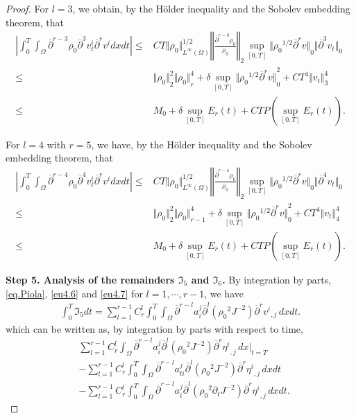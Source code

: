\documentclass[12pt,twoside,reqno]{amsart}
\numberwithin{equation}{section}
\theoremstyle{definition}
\theoremstyle{remark}
\begin{document}
\begin{proof}
For $l=3$, we obtain, by the H\"older inequality and the Sobolev embedding theorem, that
\begin{align*}
  {\left\vert{{\int_0^T\!\!\!\!\int_\Omega }  {\overline{\partial}}^{r-3}{\rho_0} {\overline{\partial}}^3  v_t^i {\overline{\partial}}^r v^idxdt}\right\vert}
  {\leqslant} &CT{\Vert{\rho_0}\Vert}_{L^\infty(\Omega)}^{1/2} {\left\Vert{\frac{{\overline{\partial}}^{r-3}{\rho_0} }{\rho_0}}\right\Vert}_2 \sup_{[0,T]}{\Vert{{\rho_0}^{1/2}{\overline{\partial}}^r v}\Vert}_0{\Vert{{\overline{\partial}}^3 v_t}\Vert}_{0}\\
  {\leqslant} &{\Vert{\rho_0}\Vert}_2^2{\Vert{\rho_0}\Vert}_r^4+\delta \sup_{[0,T]}{\Vert{{\rho_0}^{1/2}{\overline{\partial}}^r v}\Vert}_0^2 +CT^4{\Vert{v_t}\Vert}_3^4\\
  {\leqslant}&M_0+\delta\sup_{[0,T]}E_r(t)+CTP(\sup_{[0,T]}E_r(t)).
\end{align*}

For $l=4$ with $r=5$, we have, by the H\"older inequality and the Sobolev embedding theorem, that
\begin{align*}
  {\left\vert{{\int_0^T\!\!\!\!\int_\Omega }  {\overline{\partial}}^{r-4}{\rho_0} {\overline{\partial}}^4  v_t^i {\overline{\partial}}^r v^idxdt}\right\vert}
  {\leqslant} &CT{\Vert{\rho_0}\Vert}_{L^\infty(\Omega)}^{1/2} {\left\Vert{\frac{{\overline{\partial}}^{r-4}{\rho_0} }{\rho_0}}\right\Vert}_2 \sup_{[0,T]}{\Vert{{\rho_0}^{1/2}{\overline{\partial}}^r v}\Vert}_0{\Vert{{\overline{\partial}}^4 v_t}\Vert}_{0}\\
  {\leqslant} &{\Vert{\rho_0}\Vert}_2^2{\Vert{\rho_0}\Vert}_{r-1}^4+\delta \sup_{[0,T]}{\Vert{{\rho_0}^{1/2}{\overline{\partial}}^r v}\Vert}_0^2 +CT^4{\Vert{v_t}\Vert}_4^4\\
  {\leqslant}&M_0+\delta\sup_{[0,T]}E_r(t)+CTP(\sup_{[0,T]}E_r(t)).
\end{align*}

\textbf{Step 5. Analysis of the remainders ${\mathfrak{I}}_5$ and ${\mathfrak{I}}_6$.}
By integration by parts, \eqref{eq.Piola}, \eqref{eu4.6} and \eqref{eu4.7} for $l=1,\cdots, r-1$, we have
\begin{align*}
 \int_0^T {\mathfrak{I}}_5dt=\sum_{l=1}^{r-1} C_r^l{\int_0^T\!\!\!\!\int_\Omega }  {\overline{\partial}}^{r-l} a_i^j{\overline{\partial}}^l({\rho_0}^2  J^{-2}){\overline{\partial}}^r{{{v^i}}_{,{j}}\,}dxdt.
\end{align*}
which can be written as, by integration by parts with respect to time,
\begin{align}
  &\sum_{l=1}^{r-1} C_r^l\int_\Omega {\overline{\partial}}^{r-l} a_i^j{\overline{\partial}}^l({\rho_0}^2  J^{-2}){\overline{\partial}}^r{{{\eta^i}}_{,{j}}\,}dx\Big|_{t=T}\label{eq.I5.01}\\
  &-\sum_{l=1}^{r-1} C_r^l{\int_0^T\!\!\!\!\int_\Omega } {\overline{\partial}}^{r-l} a_{ti}^j{\overline{\partial}}^l({\rho_0}^2  J^{-2}){\overline{\partial}}^r{{{\eta^i}}_{,{j}}\,}dxdt\label{eq.I5.02}\\
  &-\sum_{l=1}^{r-1} C_r^l{\int_0^T\!\!\!\!\int_\Omega }  {\overline{\partial}}^{r-l} a_i^j{\overline{\partial}}^l({\rho_0}^2  {\partial}_t J^{-2}){\overline{\partial}}^r{{{\eta^i}}_{,{j}}\,}dxdt.\label{eq.I5.03}
\end{align}


\end{proof}
\end{document}
